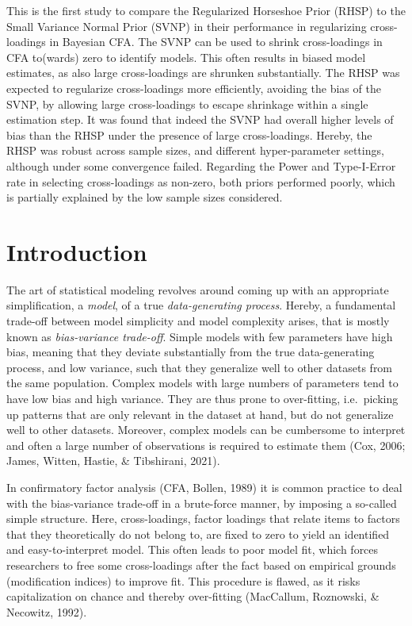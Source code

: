 \documentclass[
  man, donotrepeattitle,floatsintext]{apa6}
\begin{document}
This is the first study to compare the Regularized Horseshoe Prior (RHSP) to the Small Variance Normal Prior (SVNP) in their performance in regularizing cross-loadings in Bayesian CFA. The SVNP can be used to shrink cross-loadings in CFA to(wards) zero to identify models. This often results in biased model estimates, as also large cross-loadings are shrunken substantially. The RHSP was expected to regularize cross-loadings more efficiently, avoiding the bias of the SVNP, by allowing large cross-loadings to escape shrinkage within a single estimation step. It was found that indeed the SVNP had overall higher levels of bias than the RHSP under the presence of large cross-loadings. Hereby, the RHSP was robust across sample sizes, and different hyper-parameter settings, although under some convergence failed. Regarding the Power and Type-I-Error rate in selecting cross-loadings as non-zero, both priors performed poorly, which is partially explained by the low sample sizes considered.

\hypertarget{introduction}{%
\section{Introduction}\label{introduction}}

The art of statistical modeling revolves around coming up with an appropriate simplification, a \emph{model}, of a true \emph{data-generating process}. Hereby, a fundamental trade-off between model simplicity and model complexity arises, that is mostly known as \emph{bias-variance trade-off}. Simple models with few parameters have high bias, meaning that they deviate substantially from the true data-generating process, and low variance, such that they generalize well to other datasets from the same population. Complex models with large numbers of parameters tend to have low bias and high variance. They are thus prone to over-fitting, i.e.~picking up patterns that are only relevant in the dataset at hand, but do not generalize well to other datasets. Moreover, complex models can be cumbersome to interpret and often a large number of observations is required to estimate them (Cox, 2006; James, Witten, Hastie, \& Tibshirani, 2021).

In confirmatory factor analysis (CFA, Bollen, 1989) it is common practice to deal with the bias-variance trade-off in a brute-force manner, by imposing a so-called simple structure. Here, cross-loadings, factor loadings that relate items to factors that they
theoretically do not belong to, are fixed to zero to yield an identified and easy-to-interpret model. This often leads to poor model fit, which forces researchers to free some cross-loadings after the fact based on empirical grounds (modification indices) to improve fit. This procedure is flawed, as it risks capitalization on chance and thereby over-fitting (MacCallum, Roznowski, \& Necowitz, 1992).
\end{document}
